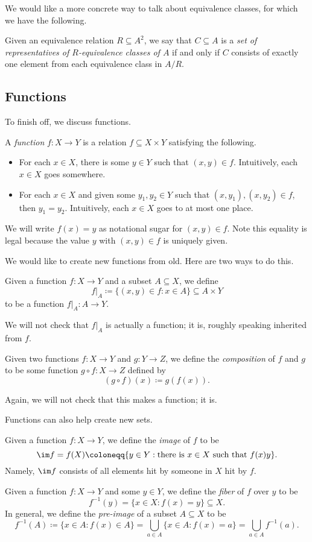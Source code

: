 We would like a more concrete way to talk about equivalence classes, for which we have the following.
\begin{definition}[Representatives]
	Given an equivalence relation $R\subseteq A^2$, we say that $C\subseteq A$ is a \textit{set of representatives of $R$-equivalence classes of $A$} if and only if $C$ consists of exactly one element from each equivalence class in $A/R$.
\end{definition}

\subsection{Functions}
To finish off, we discuss functions.
\begin{definition}[Functions]
	A \textit{function} $f\colon X\to Y$ is a relation $f\subseteq X\times Y$ satisfying the following.
	\begin{itemize}
		\item For each $x\in X$, there is some $y\in Y$ such that $(x,y)\in f$. Intuitively, each $x\in X$ goes somewhere.
		\item For each $x\in X$ and given some $y_1,y_2\in Y$ such that $(x,y_1),(x,y_2)\in f$, then $y_1=y_2$. Intuitively, each $x\in X$ goes to at most one place.
	\end{itemize}
	We will write $f(x)=y$ as notational sugar for $(x,y)\in f$. Note this equality is legal because the value $y$ with $(x,y)\in f$ is uniquely given.
\end{definition}
We would like to create new functions from old. Here are two ways to do this.
\begin{definition}[Restriction]
	Given a function $f\colon X\to Y$ and a subset $A\subseteq X$, we define
	\[f|_A\coloneqq\{(x,y)\in f:x\in A\}\subseteq A\times Y\]
	to be a function $f|_A\colon A\to Y$.
\end{definition}
We will not check that $f|_A$ is actually a function; it is, roughly speaking inherited from $f$.
\begin{definition}
	Given two functions $f\colon X\to Y$ and $g\colon Y\to Z$, we define the \textit{composition} of $f$ and $g$ to be some function $g\circ f\colon X\to Z$ defined by
	\[(g\circ f)(x)\coloneqq g(f(x)).\]
\end{definition}
Again, we will not check that this makes a function; it is.

Functions can also help create new sets.
\begin{definition}[Image]
	Given a function $f\colon X\to Y$, we define the \textit{image} of $f$ to be
	\[\im f=f(X)\coloneqq \{y\in Y:\text{there is }x\in X\text{ such that }f(x)y\}.\]
	Namely, $\im f$ consists of all elements hit by someone in $X$ hit by $f$.
\end{definition}
\begin{definition}
	Given a function $f\colon X\to Y$ and some $y\in Y$, we define the \textit{fiber} of $f$ over $y$ to be
	\[f^{-1}(y)=\{x\in X:f(x)=y\}\subseteq X.\]
	In general, we define the \textit{pre-image} of a subset $A\subseteq X$ to be
	\[f^{-1}(A)\coloneqq \{x\in A:f(x)\in A\}=\bigcup_{a\in A}\{x\in A:f(x)=a\}=\bigcup_{a\in A}f^{-1}(a).\]
\end{definition}

